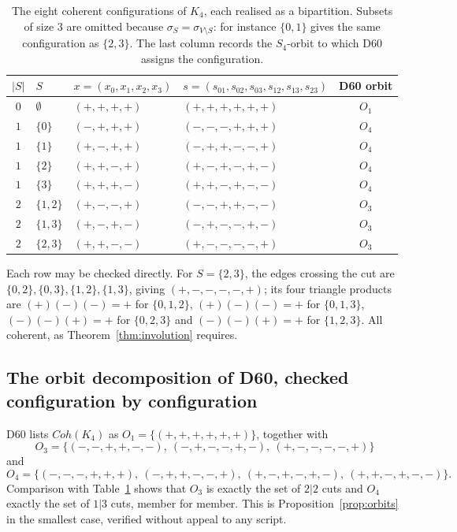 \documentclass[11pt,a4paper]{article}
\def\mathrm#1{#1}%
\def\mathcal#1{#1}%
\newcommand{\Kfour}{K_4}
\newcommand{\Coh}{\mathrm{Coh}}
\begin{document}
\begin{table}[h]
\centering
\small
\begin{tabular}{clllc}
\toprule
$|S|$ & $S$ & $x=(x_0,x_1,x_2,x_3)$ & $s=(s_{01},s_{02},s_{03},s_{12},s_{13},s_{23})$ & D60 orbit \\
\midrule
$0$ & $\emptyset$   & $(+,+,+,+)$ & $(+,+,+,+,+,+)$ & $\mathcal{O}_1$ \\
\midrule
$1$ & $\{0\}$       & $(-,+,+,+)$ & $(-,-,-,+,+,+)$ & $\mathcal{O}_4$ \\
$1$ & $\{1\}$       & $(+,-,+,+)$ & $(-,+,+,-,-,+)$ & $\mathcal{O}_4$ \\
$1$ & $\{2\}$       & $(+,+,-,+)$ & $(+,-,+,-,+,-)$ & $\mathcal{O}_4$ \\
$1$ & $\{3\}$       & $(+,+,+,-)$ & $(+,+,-,+,-,-)$ & $\mathcal{O}_4$ \\
\midrule
$2$ & $\{1,2\}$     & $(+,-,-,+)$ & $(-,-,+,+,-,-)$ & $\mathcal{O}_3$ \\
$2$ & $\{1,3\}$     & $(+,-,+,-)$ & $(-,+,-,-,+,-)$ & $\mathcal{O}_3$ \\
$2$ & $\{2,3\}$     & $(+,+,-,-)$ & $(+,-,-,-,-,+)$ & $\mathcal{O}_3$ \\
\bottomrule
\end{tabular}
\caption{The eight coherent configurations of $\Kfour$, each realised as a bipartition. Subsets of size $3$ are omitted because $\sigma_S=\sigma_{V\setminus S}$: for instance $\{0,1\}$ gives the same configuration as $\{2,3\}$. The last column records the $S_4$-orbit to which D60 assigns the configuration.}
\label{tab:worked_coh}
\end{table}

Each row may be checked directly. For $S=\{2,3\}$, the edges crossing the cut are $\{0,2\},\{0,3\},\{1,2\},\{1,3\}$, giving $(+,-,-,-,-,+)$; its four triangle products are $(+)(-)(-)=+$ for $\{0,1,2\}$, $(+)(-)(-)=+$ for $\{0,1,3\}$, $(-)(-)(+)=+$ for $\{0,2,3\}$ and $(-)(-)(+)=+$ for $\{1,2,3\}$. All coherent, as Theorem~\ref{thm:involution} requires.

\subsection{The orbit decomposition of D60, checked configuration by configuration}
\label{subsec:worked_orbits}

D60 lists $\Coh(\Kfour)$ as $\mathcal{O}_1=\{(+,+,+,+,+,+)\}$, together with
\[
\mathcal{O}_3=\{(-,-,+,+,-,-),\ (-,+,-,-,+,-),\ (+,-,-,-,-,+)\}
\]
and
\[
\mathcal{O}_4=\{(-,-,-,+,+,+),\ (-,+,+,-,-,+),\ (+,-,+,-,+,-),\ (+,+,-,+,-,-)\}.
\]
Comparison with Table~\ref{tab:worked_coh} shows that $\mathcal{O}_3$ is exactly the set of $2|2$ cuts and $\mathcal{O}_4$ exactly the set of $1|3$ cuts, member for member. This is Proposition~\ref{prop:orbits} in the smallest case, verified without appeal to any script.
\end{document}
